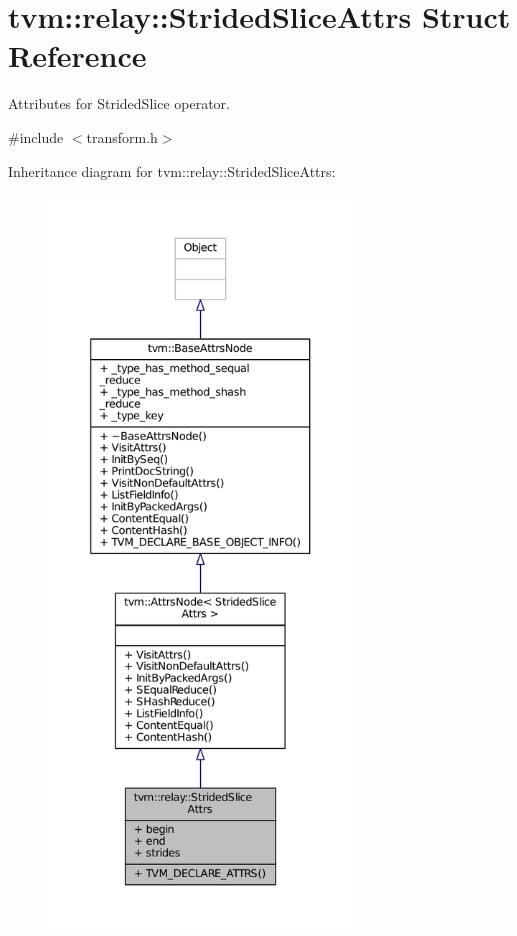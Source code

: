 \hypertarget{structtvm_1_1relay_1_1StridedSliceAttrs}{}\section{tvm\+:\+:relay\+:\+:Strided\+Slice\+Attrs Struct Reference}
\label{structtvm_1_1relay_1_1StridedSliceAttrs}


Attributes for Strided\+Slice operator.  




{\ttfamily \#include $<$transform.\+h$>$}



Inheritance diagram for tvm\+:\+:relay\+:\+:Strided\+Slice\+Attrs\+:
\nopagebreak
\begin{figure}[H]
\begin{center}
\leavevmode
\includegraphics[height=550pt]{structtvm_1_1relay_1_1StridedSliceAttrs__inherit__graph}
\end{center}
\end{figure}


